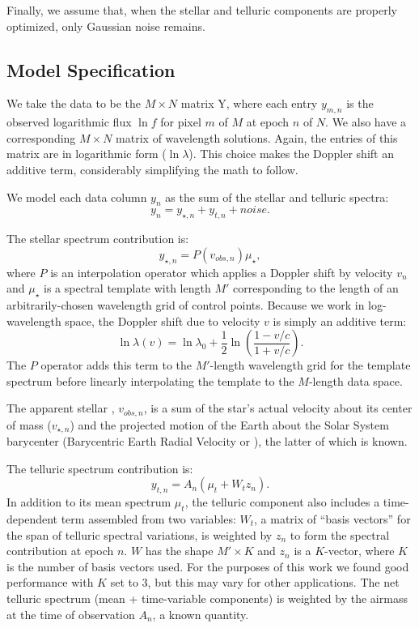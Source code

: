 \documentclass[modern]{aastex62}
\begin{document}
Finally, we assume that, when the stellar and telluric components are properly optimized, only Gaussian noise remains.

\subsection{Model Specification}
\label{s:model-eqns}

We take the data to be the $M \times N$ matrix Y, where each entry $y_{m,n}$ is the observed logarithmic flux $\ln f$ for pixel $m$ of $M$ at epoch $n$ of $N$.
We also have a corresponding $M \times N$ matrix of wavelength solutions.
Again, the entries of this matrix are in logarithmic form ($\ln \lambda$).
This choice makes the Doppler shift an additive term, considerably simplifying the math to follow.

We model each data column $y_n$ as the sum of the stellar and telluric spectra:
\begin{equation}
y_n = y_{\star, n} + y_{t, n} + noise.
\end{equation}

The stellar spectrum contribution is:
\begin{equation}
y_{\star, n} = P(v_{obs, n}) \mu_{\star},
\end{equation}
where $P$ is an interpolation operator which applies a Doppler shift by velocity $v_n$ and $\mu_{\star}$ is a spectral template with length $M'$ corresponding to the length of an arbitrarily-chosen wavelength grid of control points.
Because we work in log-wavelength space, the Doppler shift due to velocity $v$ is simply an additive term:
\begin{equation}
 \ln \lambda(v) = \ln \lambda_{0} + \frac{1}{2} \ln \left(\frac{1 - v/c}{1 + v/c}\right).
\end{equation}
The $P$ operator adds this term to the $M'$-length wavelength grid for the template spectrum before linearly interpolating the template to the $M$-length data space.

The apparent stellar \RV, $v_{obs, n}$, is a sum of the star's actual velocity about its center of mass ($v_{\star, n}$) and the projected motion of the Earth about the Solar System barycenter (Barycentric Earth Radial Velocity or \BERV), the latter of which is known.

The telluric spectrum contribution is:
\begin{equation}
y_{t, n} =  A_n(\mu_{t} + W_{t} z_n).
\end{equation}
In addition to its mean spectrum $\mu_t$, the telluric component also includes a time-dependent term assembled from two variables: $W_t$, a matrix of ``basis vectors'' for the span of telluric spectral variations, is weighted by $z_n$ to form the spectral contribution at epoch $n$.
$W$ has the shape $M' \times K$ and $z_n$ is a $K$-vector, where $K$ is the number of basis vectors used.
For the purposes of this work we found good performance with $K$ set to 3, but this may vary for other applications.
The net telluric spectrum (mean + time-variable components) is weighted by the airmass at the time of observation $A_n$, a known quantity.
\end{document}
